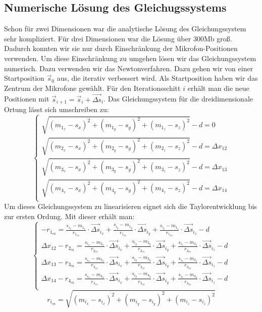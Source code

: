 \subsection{Numerische Lösung des Gleichugssystems}
Schon für zwei Dimensionen war die analytische Lösung des Gleichungssystem sehr kompliziert. Für drei Dimensionen war die Lösung über 300Mb groß. Dadurch konnten wir sie nur durch Einschränkung der Mikrofon-Positionen verwenden. Um diese Einschränkung zu umgehen lösen wir das Gleichungssystem numerisch. Dazu verwenden wir das Newtonverfahren. Dazu gehen wir von einer Startposition $\vec{s}_0$ aus, die iterativ verbessert wird. Als Startposition haben wir das Zentrum der Mikrofone gewählt. Für den Iterationsschitt $i$ erhält man die neue Positionen mit $\vec{s}_{i + 1} = \vec{s}_i + \vec{\Delta{s}}_i$. Das Gleichungssystem für die dreidimensionale Ortung lässt sich umschreiben zu:
$$\begin{cases}
\sqrt{(m_{1_x} - s_x)^2 + (m_{1_y} - s_y)^2 + (m_{1_z} - s_z)^2} - d = 0 \\
\sqrt{(m_{2_x} - s_x)^2 + (m_{2_y} - s_y)^2 + (m_{2_z} - s_z)^2} - d = \Delta{x_{12}} \\
\sqrt{(m_{3_x} - s_x)^2 + (m_{3_y} - s_y)^2 + (m_{3_z} - s_z)^2} - d = \Delta{x_{13}} \\
\sqrt{(m_{4_x} - s_x)^2 + (m_{4_y} - s_y)^2 + (m_{4_z} - s_z)^2} - d = \Delta{x_{14}} \\
\end{cases}$$
Um dieses Gleichungssystem zu linearisieren eignet sich die Taylorentwicklung bis zur ersten Ordung. Mit dieser erhält man:
$$\begin{cases}
-r_{1_{ca}} = \frac{s_{i_x} - m_{1_x}}{r_{1_{ca}}} \cdot \vec{\Delta{s}}_{i_x} + \frac{s_{i_y} - m_{1_y}}{r_{1_{ca}}} \cdot \vec{\Delta{s}}_{i_y} + \frac{s_{i_z} - m_{1_z}}{r_{1_{ca}}} \cdot \vec{\Delta{s}}_{i_z} - d \\
\Delta{x_{12}} - r_{2_{ca}} = \frac{s_{i_x} - m_{2_x}}{r_{2_{ca}}} \cdot \vec{\Delta{s}}_{i_x} + \frac{s_{i_y} - m_{2_y}}{r_{2_{ca}}} \cdot \vec{\Delta{s}}_{i_y} + \frac{s_{i_z} - m_{2_z}}{r_{2_{ca}}} \cdot \vec{\Delta{s}}_{i_z} - d \\
\Delta{x_{13}} - r_{3_{ca}} = \frac{s_{i_x} - m_{3_x}}{r_{3_{ca}}} \cdot \vec{\Delta{s}}_{i_x} + \frac{s_{i_y} - m_{3_y}}{r_{3_{ca}}} \cdot \vec{\Delta{s}}_{i_y} + \frac{s_{i_z} - m_{3_z}}{r_{3_{ca}}} \cdot \vec{\Delta{s}}_{i_z} - d \\
\Delta{x_{14}} - r_{4_{ca}} = \frac{s_{i_x} - m_{4_x}}{r_{4_{ca}}} \cdot \vec{\Delta{s}}_{i_x} + \frac{s_{i_y} - m_{4_y}}{r_{4_{ca}}} \cdot \vec{\Delta{s}}_{i_y} + \frac{s_{i_z} - m_{4_z}}{r_{4_{ca}}} \cdot \vec{\Delta{s}}_{i_z} - d \\
\end{cases}$$
$$r_{i_{ca}} = \sqrt{(m_{i_x} - s_{i_x})^2 + (m_{i_y} - s_{i_y})^2 + (m_{i_z} - s_{i_z})^2}$$

